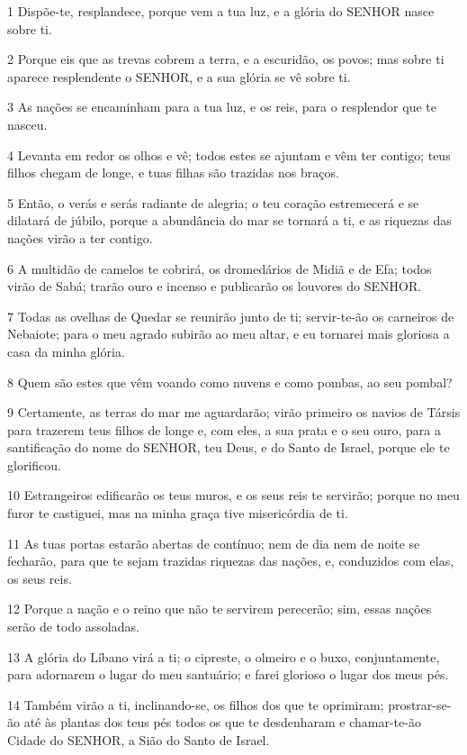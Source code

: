 \par 1 Dispõe-te, resplandece, porque vem a tua luz, e a glória do SENHOR nasce sobre ti.
\par 2 Porque eis que as trevas cobrem a terra, e a escuridão, os povos; mas sobre ti aparece resplendente o SENHOR, e a sua glória se vê sobre ti.
\par 3 As nações se encaminham para a tua luz, e os reis, para o resplendor que te nasceu.
\par 4 Levanta em redor os olhos e vê; todos estes se ajuntam e vêm ter contigo; teus filhos chegam de longe, e tuas filhas são trazidas nos braços.
\par 5 Então, o verás e serás radiante de alegria; o teu coração estremecerá e se dilatará de júbilo, porque a abundância do mar se tornará a ti, e as riquezas das nações virão a ter contigo.
\par 6 A multidão de camelos te cobrirá, os dromedários de Midiã e de Efa; todos virão de Sabá; trarão ouro e incenso e publicarão os louvores do SENHOR.
\par 7 Todas as ovelhas de Quedar se reunirão junto de ti; servir-te-ão os carneiros de Nebaiote; para o meu agrado subirão ao meu altar, e eu tornarei mais gloriosa a casa da minha glória.
\par 8 Quem são estes que vêm voando como nuvens e como pombas, ao seu pombal?
\par 9 Certamente, as terras do mar me aguardarão; virão primeiro os navios de Társis para trazerem teus filhos de longe e, com eles, a sua prata e o seu ouro, para a santificação do nome do SENHOR, teu Deus, e do Santo de Israel, porque ele te glorificou.
\par 10 Estrangeiros edificarão os teus muros, e os seus reis te servirão; porque no meu furor te castiguei, mas na minha graça tive misericórdia de ti.
\par 11 As tuas portas estarão abertas de contínuo; nem de dia nem de noite se fecharão, para que te sejam trazidas riquezas das nações, e, conduzidos com elas, os seus reis.
\par 12 Porque a nação e o reino que não te servirem perecerão; sim, essas nações serão de todo assoladas.
\par 13 A glória do Líbano virá a ti; o cipreste, o olmeiro e o buxo, conjuntamente, para adornarem o lugar do meu santuário; e farei glorioso o lugar dos meus pés.
\par 14 Também virão a ti, inclinando-se, os filhos dos que te oprimiram; prostrar-se-ão até às plantas dos teus pés todos os que te desdenharam e chamar-te-ão Cidade do SENHOR, a Sião do Santo de Israel.
